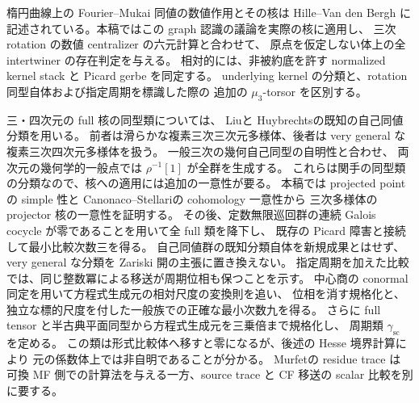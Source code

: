 楕円曲線上の Fourier--Mukai 同値の数値作用とその核は
Hille--Van den Bergh\cite[Proposition~4.2, Corollary~4.3, Theorem~5.3]{NFMHilleVdBFM}
に記述されている。本稿ではこの graph 認識の議論を実際の核に適用し、
三次 rotation の数値 centralizer の六元計算と合わせて、
原点を仮定しない体上の全 intertwiner の存在判定を与える。
相対的には、非被約底を許す normalized kernel stack と Picard gerbe を同定する。
underlying kernel の分類と、rotation 同型自体および指定周期を標識した際の
追加の $\mu_3$-torsor を区別する。

三・四次元の full 核の同型類については、
Liu\cite[Theorem~4.13]{NFMLiuCubicThreefoldAut}と
Huybrechts\cite[Theorem~1.2(i)]{NFMHuybrechtsK3Cubic}の既知の自己同値分類を用いる。
前者は滑らかな複素三次三次元多様体、後者は very general な複素三次四次元多様体を扱う。
一般三次の幾何自己同型の自明性\cite[Theorems~1.1, 1.5]{NFMPoonenAutomorphisms}と合わせ、
両次元の幾何学的一般点では $\rho^{-1}[1]$ が全群を生成する。
これらは関手の同型類の分類なので、核への適用には追加の一意性が要る。
本稿では projected point の simple 性と
Canonaco--Stellari\cite[Corollary~4.4]{NFMCanonacoStellariKernels}の cohomology 一意性から
三次多様体の projector 核の一意性を証明する。
その後、定数無限巡回群の連続 Galois cocycle が零であることを用いて全 full 類を降下し、
既存の Picard 障害と接続して最小比較次数三を得る。
自己同値群の既知分類自体を新規成果とはせず、very general な分類を Zariski 開の主張に置き換えない。
指定周期を加えた比較では、同じ整数冪による移送が周期位相も保つことを示す。
中心商の conormal 同定を用いて方程式生成元の相対尺度の変換則を追い、
位相を消す規格化と、独立な標的尺度を付した一般族での正確な最小次数九を得る。
さらに full tensor と半古典平面同型から方程式生成元を三乗倍まで規格化し、
周期類 $\gamma_{\mathrm{sc}}$ を定める。
この類は形式比較体へ移すと零になるが、後述の Hesse 境界計算により
元の係数体上では非自明であることが分かる。
Murfet\cite[Theorem~6.2, equation~(6.6)]{NFMMurfetResidue}の residue trace は
可換 MF 側での計算法を与える一方、source trace と CF 移送の scalar 比較を別に要する。

